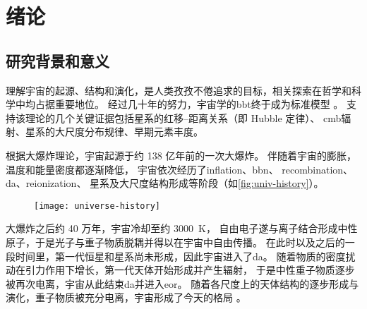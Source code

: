 
\chapter{绪论}
\label{chap:introduction}

\section{研究背景和意义}

理解宇宙的起源、结构和演化，是人类孜孜不倦追求的目标，相关探索在哲学和科学中均占据重要地位。
经过几十年的努力，宇宙学的\ac{bbt}终于成为标准模型
\cite{weinberg1972,weinberg2008,peebles1993,peacock1999}。
支持该理论的几个关键证据包括星系的红移--距离关系（即 Hubble 定律）、
\ac{cmb}辐射、星系的大尺度分布规律、早期元素丰度。

根据大爆炸理论，宇宙起源于约 138 亿年前的一次大爆炸。
伴随着宇宙的膨胀，温度和能量密度都逐渐降低，
宇宙依次经历了\ac{inflation}、\ac{bbn}、
\ac{recombination}、\ac{da}、\ac{reionization}、
星系及大尺度结构形成等阶段（如\autoref{fig:univ-history}）。

\begin{figure}[htp]
  \centering
  \texttt{[image: universe-history]}
  \label{fig:univ-history}
\end{figure}

大爆炸之后约 40 万年，宇宙冷却至约 \SI{3000}{\kelvin}，
自由电子遂与离子结合形成中性原子，于是光子与重子物质脱耦并得以在宇宙中自由传播。
在此时以及之后的一段时间里，第一代恒星和星系尚未形成，因此宇宙进入了\ac{da}。
随着物质的密度扰动在引力作用下增长，第一代天体开始形成并产生辐射，
于是中性重子物质逐步被再次电离，宇宙从此结束\ac{da}并进入\ac{eor}。
随着各尺度上的天体结构的逐步形成与演化，重子物质被充分电离，宇宙形成了今天的格局
\cite{peebles1980,peebles1993,peacock1999}。

